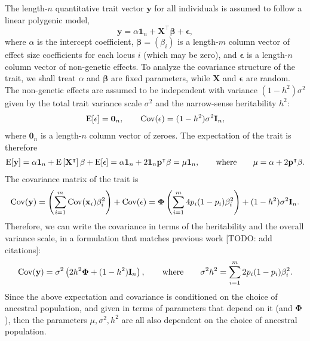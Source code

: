 \documentclass[11pt]{article}
\begin{document}
The length-$n$ quantitative trait vector $\mathbf{y}$ for all individuals is assumed to follow a linear polygenic model,
$$
\mathbf{y} = \alpha \mathbf{1}_n + \mathbf{X}^\intercal \mathbf{\beta}  + \mathbf{\epsilon},
$$
where $\alpha$ is the intercept coefficient, $\mathbf{\beta} = (\beta_i)$ is a length-$m$ column vector of effect size coefficients for each locus $i$ (which may be zero), and $\mathbf{\epsilon}$ is a length-$n$ column vector of non-genetic effects.
To analyze the covariance structure of the trait, we shall treat $\alpha$ and $\mathbf{\beta}$ are fixed parameters, while $\mathbf{X}$ and $\mathbf{\epsilon}$ are random.
The non-genetic effects are assumed to be independent with variance $(1-h^2) \sigma^2$ given by the total trait variance scale $\sigma^2$ and the narrow-sense heritability $h^2$:
\begin{align*}
  \operatorname{E}[\mathbf{\epsilon}]
  =
  \mathbf{0}_n
  ,
  \quad\quad
  \operatorname{Cov}(\mathbf{\epsilon})
  =
  (1-h^2) \sigma^2 \mathbf{I}_n
  ,
\end{align*}
where $\mathbf{0}_n$ is a length-$n$ column vector of zeroes.
The expectation of the trait is therefore
\begin{align*}
  \operatorname{E}[\mathbf{y}]
  = \alpha \mathbf{1}_n + \operatorname{E} \left[ \mathbf{X}^\intercal \right] \mathbf{\beta} + \operatorname{E}[\mathbf{\epsilon}]
  = \alpha \mathbf{1}_n + 2 \mathbf{1}_n \mathbf{p}^\intercal \mathbf{\beta}
  = \mu \mathbf{1}_n
  , \quad\quad \text{where} \quad\quad
  \mu 
  =
  \alpha + 2 \mathbf{p}^\intercal \mathbf{\beta}
  .
\end{align*}
The covariance matrix of the trait is
\begin{align*}
  \operatorname{Cov}(\mathbf{y})
  =
  \left( \sum_{i=1}^m \operatorname{Cov}(\mathbf{x}_i) \beta_i^2 \right) + \operatorname{Cov}(\mathbf{\epsilon})
  =
  \mathbf{\Phi} \left( \sum_{i=1}^m 4  p_i   (1- p_i  ) \beta_i^2 \right) + (1-h^2) \sigma^2 \mathbf{I}_n
  .
\end{align*}
Therefore, we can write the covariance in terms of the heritability and the overall variance scale, in a formulation that matches previous work [TODO: add citations]:
\begin{align*}
  \operatorname{Cov}(\mathbf{y})
  =
  \sigma^2 \left( 2 h^2 \mathbf{\Phi}  + (1-h^2) \mathbf{I}_n \right)
  , \quad\quad \text{where} \quad\quad
  \sigma^2 h^2 
  = 
  \sum_{i=1}^m 2  p_i   (1- p_i  ) \beta_i^2
  .
\end{align*}
Since the above expectation and covariance is conditioned on the choice of ancestral population, and given in terms of parameters that depend on it (\pit and $\mathbf{\Phi}$), then the parameters $\mu, \sigma^2, h^2$ are all also dependent on the choice of ancestral population.
\end{document}
